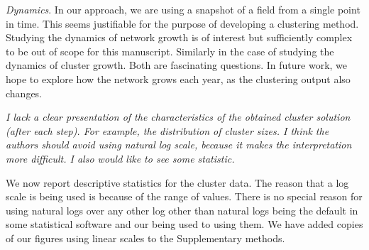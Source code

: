 \documentclass[11pt, oneside]{article}   	%
\begin{document}
\emph{Dynamics}. In our approach, we are using a snapshot of a field from a single point in time. This seems justifiable for the purpose of developing a clustering method. Studying the dynamics of network growth is of interest but sufficiently complex to be out of scope for this manuscript. Similarly in the case of studying the dynamics of cluster growth. Both are fascinating questions.  In future work,
we hope to explore how the network grows each year,  as the clustering output also changes. 
 
\emph{I lack a clear presentation of the characteristics of the obtained cluster solution (after each step). For example, the distribution of cluster sizes. I think the authors should avoid using natural log scale, because it makes the interpretation more difficult. I also would like to see some statistic.}

We now report descriptive statistics for the cluster data. The reason that a log scale is being used is because of the range of values. There is no special reason for using natural logs over any other log other than natural logs being the default in some statistical software and our being used to using them. We have added copies of our figures using linear scales to the Supplementary methods. 

\vspace{4 mm}
\end{document}
